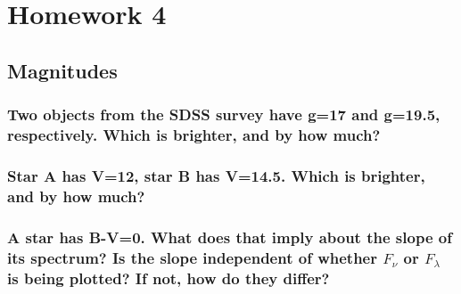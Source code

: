 \documentclass[12pt]{article}
\begin{document}
\section*{Homework 4}
\subsection*{Magnitudes}
\subsubsection{Two objects from the SDSS survey have g=17 and g=19.5,
respectively. Which is brighter, and by how much?}

\subsubsection{Star A has V=12, star B has V=14.5. Which is brighter,
and by how much?}

\subsubsection{A star has B-V=0. What does that imply about the slope of its
spectrum? Is the slope independent of whether $F_{\nu}$ or $F_{\lambda}$
is being plotted? If not, how do they differ?}
\end{document}
